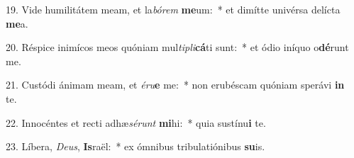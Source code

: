 19. Vide humilitátem meam, et la\textit{bó}\textit{rem} \textbf{me}um:~*  et dimítte univérsa delícta \textbf{me}a.\

20. Réspice inimícos meos quóniam mul\textit{ti}\textit{pli}\textbf{cá}ti sunt:~*  et ódio iníquo o\textbf{dé}runt me.\

21. Custódi ánimam meam, et \textit{é}\textit{ru}\textbf{e} me:~*  non erubéscam quóniam sperávi \textbf{in} te.\

22. Innocéntes et recti adhæ\textit{sé}\textit{runt} \textbf{mi}hi:~*  quia sustínu\textbf{i} te.\

23. Líbera, \textit{De}\textit{us}, \textbf{Is}raël:~*  ex ómnibus tribulatiónibus \textbf{su}is.\

